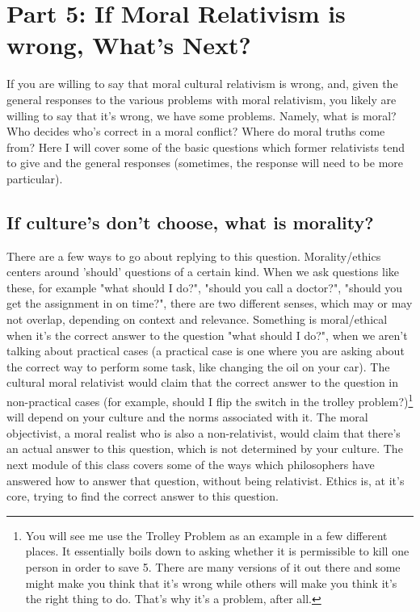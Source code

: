 \chapter{Part 5: If Moral Relativism is wrong, What's Next?}

If you are willing to say that moral cultural relativism is wrong, and, given the general responses to the various problems with moral relativism, you likely are willing to say that it's wrong, we have some problems. Namely, what is moral? Who decides who's correct in a moral conflict? Where do moral truths come from? Here I will cover some of the basic questions which former relativists tend to give and the general responses (sometimes, the response will need to be more particular).
\section{If culture's don't choose, what is morality?}

There are a few ways to go about replying to this question. Morality/ethics centers around 'should' questions of a certain kind. When we ask questions like these, for example "what should I do?", "should you call a doctor?", "should you get the assignment in on time?",  there are two different senses, which may or may not overlap, depending on context and relevance. Something is moral/ethical when it's the correct answer to the question "what should I do?", when we aren't talking about practical cases (a practical case is one where you are asking about the correct way to perform some task, like changing the oil on your car). The cultural moral relativist would claim that the correct answer to the question in non-practical cases (for example, should I flip the switch in the trolley problem?)\footnote{You will see me use the Trolley Problem as an example in a few different places. It essentially boils down to asking whether it is permissible to kill one person in order to save 5. There are many versions of it out there and some might make you think that it's wrong while others will make you think it's the right thing to do. That's why it's a problem, after all.} will depend on your culture and the norms associated with it. The moral objectivist, a moral realist who is also a non-relativist, would claim that there's an actual answer to this question, which is not determined by your culture. The next module of this class covers some of the ways which philosophers have answered how to answer that question, without being relativist. Ethics is, at it's core, trying to find the correct answer to this question.

